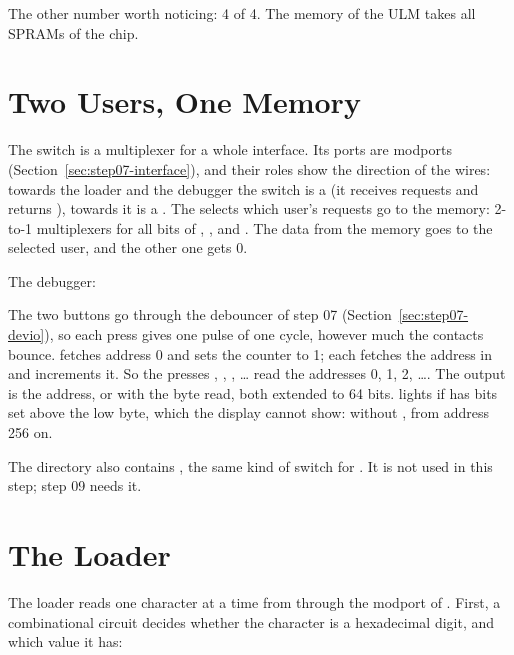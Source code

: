 The other number worth noticing:  4 of 4. The memory of the
ULM takes all SPRAMs of the chip.

\section{Two Users, One Memory}
\label{sec:step08-switch}


The switch is a multiplexer for a whole interface. Its ports are modports
(Section~\ref{sec:step07-interface}), and their roles show the direction of the
wires: towards the loader and the debugger the switch is a  (it
receives requests and returns ), towards  it is a
. The  selects which user's requests go to the memory:
2-to-1 multiplexers for all bits of ,
,  and . The data from the memory goes to
the selected user, and the other one gets 0.

The debugger:


The two buttons go through the debouncer of step 07
(Section~\ref{sec:step07-devio}), so each press gives one pulse of one
cycle, however much the contacts bounce.  fetches address 0 and
sets the counter  to 1; each  fetches the address in
 and increments it. So the presses , ,
, \dots{} read the addresses 0, 1, 2, \dots. The output 
is the address, or with  the byte read, both extended to 64 bits.
 lights if  has bits set above the low byte, which the
display cannot show: without , from address 256 on.

The directory also contains , the same kind of switch for
. It is not used in this step; step 09 needs it.

\section{The Loader}
\label{sec:step08-loader}

The loader reads one character at a time from  through the
 modport of . First, a combinational circuit decides
whether the character is a hexadecimal digit, and which value it has:


